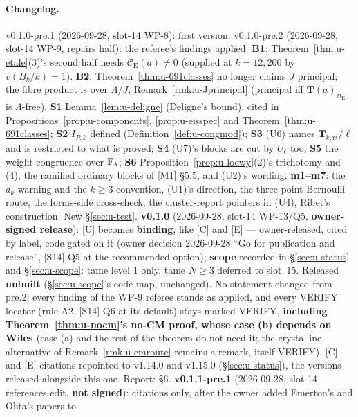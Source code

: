 \documentclass[11pt]{article}
\newcommand{\VERIFYloc}{\textsf{VERIFY}}          %
\newcommand{\Iw}{\Lambda}                         %
\newcommand{\Tu}{\mathbf{T}}                      %
\newcommand{\Eis}{\mathrm{E}}
\newcommand{\Cg}{\mathcal{C}}                     %
\begin{document}
\paragraph{Changelog.} v0.1.0-pre.1 (2026-09-28, slot-14 WP-8): first version.
v0.1.0-pre.2 (2026-09-28, slot-14 WP-9, repairs half): the referee's findings applied. \textbf{B1}: Theorem~\ref{thm:u-etale}(3)'s second half needs
$\Cg_\Eis(a)\ne0$ (supplied at $k=12,200$ by $v(B_k/k)=1$). \textbf{B2}: Theorem~\ref{thm:u-691classes} no longer claims $J$ principal; the fibre product is over
$\Iw/J$, Remark~\ref{rmk:u-Jprincipal} (principal iff $\Tu(a)_{\mathfrak m_\Eis}$ is $\Iw$-free). \textbf{S1} Lemma~\ref{lem:u-deligne} (Deligne's bound), cited in
Propositions~\ref{prop:u-components}, \ref{prop:u-eisspec} and Theorem~\ref{thm:u-691classes}; \textbf{S2} $I_{P,k}$ defined (Definition~\ref{def:u-congmod}); \textbf{S3}
(U6) names $\Tu_{k,\mathfrak m}/\ell$ and is restricted to what is proved; \textbf{S4} (U7)'s blocks are cut by $U_\ell$ too; \textbf{S5} the weight congruence over
$\mathbb{F}_\lambda$; \textbf{S6} Proposition~\ref{prop:u-loewy}(2)'s trichotomy and (4), the ramified ordinary blocks of [M1] \S5.5, and (U2)'s wording. \textbf{m1--m7}: the $d_k$
warning and the $k\ge3$ convention, (U1)'s direction, the three-point Bernoulli route, the forms-side cross-check, the cluster-report pointers in (U4), Ribet's
construction. New \S\ref{sec:u-test}.
\textbf{v0.1.0} (2026-09-28, slot-14 WP-13/Q5, \textbf{owner-signed release}): [U] becomes \textbf{binding}, like [C] and [E] --- owner-released, cited by label,
code gated on it (owner decision 2026-09-28 ``Go for publication and release'', [S14] Q5 at the recommended option); \textbf{scope} recorded in
\S\ref{sec:u-status} and \S\ref{sec:u-scope}: tame level $1$ only, tame $N\ge3$ deferred to slot~15. Released \textbf{unbuilt} (\S\ref{sec:u-scope}'s code map,
unchanged). No statement changed from pre.2: every finding of the WP-9 referee stands as applied, and every \VERIFYloc{} locator (rule A2, [S14] Q6 at its
default) stays marked \VERIFYloc{}, \textbf{including Theorem~\ref{thm:u-nocm}'s no-CM proof, whose case (b) depends on Wiles \cite[Thm.~2.1.4]{wiles_ordinary}}
(case (a) and the rest of the theorem do not need it; the crystalline alternative of Remark~\ref{rmk:u-cmroute} remains a remark, itself \VERIFYloc{}). [C]
and [E] citations repointed to v1.14.0 and v1.15.0 (\S\ref{sec:u-status}), the versions released alongside this one. Report:
 \S6.
\textbf{v0.1.1-pre.1} (2026-09-28, slot-14 references edit, \textbf{not signed}): citations only, after the owner added Emerton's and Ohta's papers to
\end{document}
